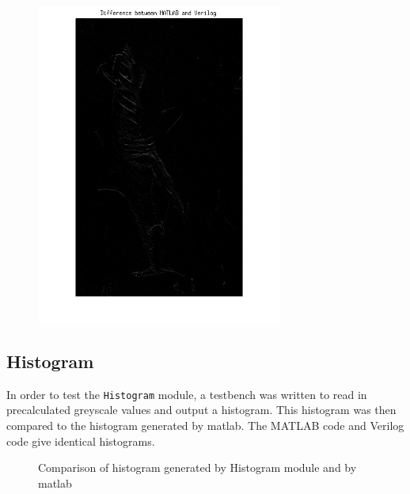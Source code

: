 \documentclass[12pt]{article}
\begin{document}
\begin{figure}[H]
  \centering
  \includegraphics[height=300pt, angle=-90]{Images/RGB2GRAY/Difference.png}
\end{figure}

    
\newpage
  \subsection{Histogram}
  In order to test the \texttt{Histogram} module, a testbench was written to read in precalculated greyscale values and output a histogram. This histogram was then compared to the histogram generated by matlab. The MATLAB code and Verilog code give identical histograms.
  \begin{figure}[H]
    \caption{Comparison of histogram generated by Histogram module and by matlab}
    \label{fig:histogram_testbench}
  \end{figure} 
  
\end{document}
